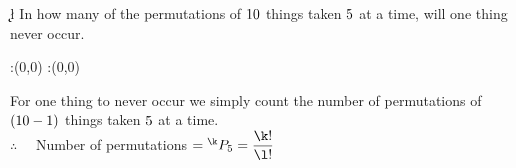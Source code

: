 


\SUBTRACT{}\k
\SUBTRACT\k\vbtwo\l
\question[3] In how many of the permutations of $10$ things taken $5$ at a time, will one thing never occur.


\watchout

\ifprintanswers
  \begin{marginfigure}
      :(0,0)
      :(0,0)
    \figdrawbegin{}
      \figdrawline [100,101]
    \figdrawend
    \figvisu{\figBoxA}{}{%
    }
    \centerline{\box\figBoxA}
  \end{marginfigure}
\fi 

\begin{solution}[\mcq]
For one thing to never occur we simply count the number of permutations of $(10 - 1)$ things taken $5$ at a time.\\
$\therefore \quad$ Number of permutations $= {^{\k}}{P}_{\vbtwo} = \dfrac{\k!}{\l!}$ 
\end{solution}


